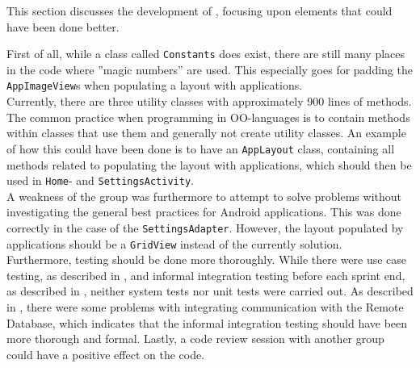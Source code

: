 This section discusses the development of \launcher, focusing upon elements that could have been done better.

First of all, while a class called \lstinline|Constants| does exist, there are still many places in the code where ''magic numbers'' are used.
This especially goes for padding the \lstinline|AppImageView|s when populating a layout with applications.\\

Currently, there are three utility classes with approximately 900 lines of methods.
The common practice when programming in OO-languages is to contain methods within classes that use them and generally not create utility classes.
An example of how this could have been done is to have an \lstinline|AppLayout| class, containing all methods related to populating the layout with applications, which should then be used in \lstinline|Home|- and \lstinline|SettingsActivity|.\\

A weakness of the group was furthermore to attempt to solve problems without investigating the general best practices for Android applications.
This was done correctly in the case of the \lstinline|SettingsAdapter|.
However, the layout populated by applications should be a \lstinline|GridView| instead of the currently solution.\\

Furthermore, testing should be done more thoroughly.
While there were use case testing, as described in , and informal integration testing before each sprint end, as described in , neither system tests nor unit tests were carried out.
As described in , there were some problems with integrating communication with the Remote Database, which indicates that the informal integration testing should have been more thorough and formal.
Lastly, a code review session with another group could have a positive effect on the code.